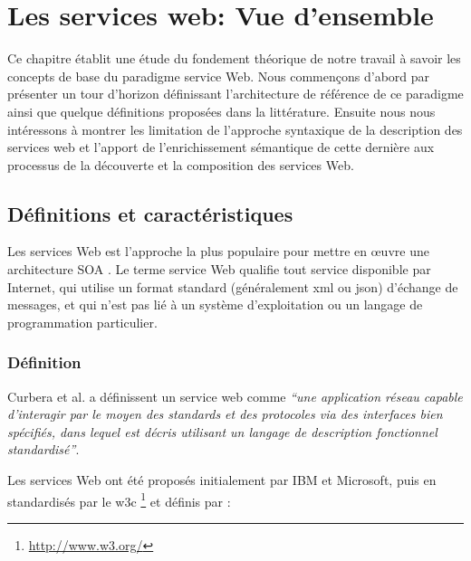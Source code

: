 
\chapter{Les services web: Vue d'ensemble}
Ce chapitre établit une étude du fondement théorique de notre travail
à savoir les concepts de base du paradigme service Web.  Nous
commençons d'abord par présenter un tour d'horizon définissant
l'architecture de référence de ce paradigme ainsi que quelque
définitions proposées dans la littérature. Ensuite nous nous
intéressons à montrer les limitation de l'approche syntaxique de la
description des services web et l'apport de l'enrichissement
sémantique de cette dernière aux processus de la découverte et la
composition des services Web.\\

\newpage
\section{Définitions et caractéristiques}
\label{sec:ws-notions-de-base}

Les services Web est l'approche la plus populaire pour mettre en œuvre
une architecture SOA . Le terme service Web qualifie tout service
disponible par Internet, qui utilise un format standard (généralement
\acrshort{xml} ou \acrshort{json}) d'échange de messages, et qui n'est
pas lié à un système d'exploitation ou un langage de programmation
particulier.



  \subsection{Définition}
  \label{sec:ws-definition}
  Curbera et al. \cite{curbera2001web} a définissent un service web
  comme \emph{``une application réseau capable d'interagir par le
    moyen des standards et des protocoles via des interfaces bien
    spécifiés, dans lequel est décris utilisant un langage de
    description fonctionnel standardisé''}.

  Les services Web ont été proposés initialement par IBM
  \cite{kreger2001web} et Microsoft, puis en standardisés par le
  \acrshort{w3c} \footnote{\url{http://www.w3.org/}} et définis
  \cite{WSA} par :

